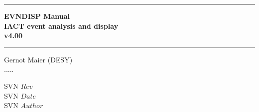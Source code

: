 
\newcommand{\HRule}{\rule{\linewidth}{1mm}}

\begin{titlepage}
\thispagestyle{empty}
\setlength{\parindent}{0mm}
\setlength{\parskip}{0mm}

\vspace*{10mm}
\HRule
\begin{flushright}
 \Huge \bf
  EVNDISP Manual \\
    IACT event analysis and display \\
     v4.00
\end{flushright}
\HRule
\vspace{10mm}
\begin{center}
   \Large
   
   \vspace{3.5cm}
  
   \vspace{0.5cm}
    
   \vspace{0.5cm}
   Gernot Maier (DESY) \\
   .....\\

   \vspace{6.3cm}

\end{center}
\begin{flushleft}
\Large
 SVN $Rev$  \\
SVN $Date$ \\
SVN $Author$

\end{flushleft}

%

\end{titlepage}

